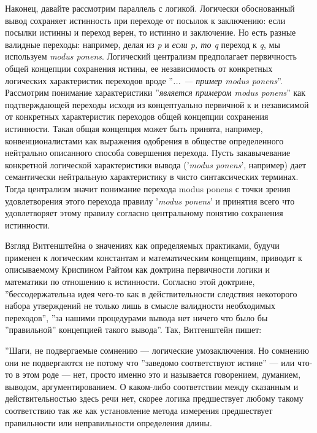 \documentclass[11pt]{book}
\begin{document}
\relax
{}\relax
\smallskip

Наконец, давайте рассмотрим параллель с логикой. Логически обоснованный вывод сохраняет истинность при переходе от посылок к заключению: если посылки истинны и переход верен, то истинно и заключение. Но есть разные валидные переходы: например, делая из \textit{p} и \textit{если p, то q} переход к \textit{q}, мы используем \textit{modus ponens}. Логический централизм предполагает первичность общей концепции сохранения истины, ее независимость от конкретных логических характеристик переходов вроде ''\textit{... --- пример modus ponens}''. Рассмотрим понимание характеристики ''\textit{является примером modus ponens}'' как подтверждающей переходы исходя из концептуально первичной к и независимой от конкретных характеристик переходов общей концепции сохранения истинности. Такая общая концепция может быть принята, например, конвенционалистами как выражения одобрения в обществе определенного нейтрально описанного способа совершения перехода. Пусть закавычевание конкретной логической характеристики вывода ('\textit{modus ponens}', например) дает семантически нейтральную характеристику в чисто синтаксических терминах. Тогда централизм значит понимание перехода modus ponens с точки зрения удовлетворения этого перехода правилу '\textit{modus ponens}' и принятия всего что удовлетворяет этому правилу согласно центральному понятию сохранения истинности.

Взгляд Витгенштейна о значениях как определяемых практиками, будучи применен к логическим константам и математическим концепциям, приводит к описываемому Криспином Райтом как доктрина первичности логики и математики по отношению к истинности. Согласно этой доктрине, ''бессодержательна идея чего-то как в действительности следствия некоторого набора утверждений не только лишь в смысле валидности необходимых переходов'', ''за нашими процедурами вывода нет ничего что было бы ''правильной'' концепцией такого вывода''. Так, Витгенштейн пишет:

\smallskip
{}\relax
{}\relax

''Шаги, не подвергаемые сомнению --- логические умозаключения. Но сомнению они не подвергаются не потому что ''заведомо соответствуют истине'' --- или что-то в этом роде --- нет, просто именно это и называется говорением, думанием, выводом, аргументированием. О каком-либо соответствии между сказанным и действительностью здесь речи нет, скорее логика предшествует любому такому соответствию так же как установление метода измерения предшествует правильности или неправильности определения длины.
\end{document}

